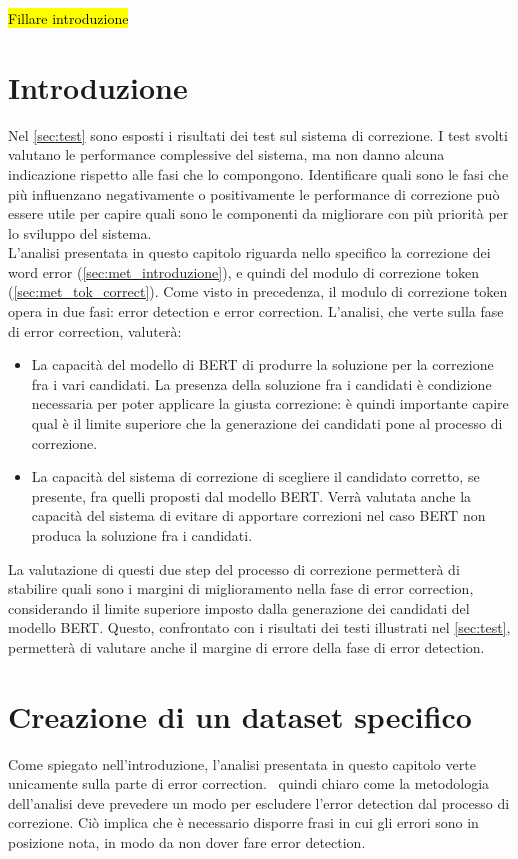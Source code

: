 \hl{Fillare introduzione}

\section{Introduzione}
\label{sec:ana_intro}
Nel \autoref{sec:test} sono esposti i risultati dei test sul sistema di correzione. I test svolti valutano le performance complessive del sistema, ma non danno alcuna indicazione rispetto alle fasi che lo compongono. Identificare quali sono le fasi che più influenzano negativamente o positivamente le performance di correzione può essere utile per capire quali sono le componenti da migliorare con più priorità per lo sviluppo del sistema.\\
L'analisi presentata in questo capitolo riguarda nello specifico la correzione dei word error (\autoref{sec:met_introduzione}), e quindi del modulo di correzione token (\autoref{sec:met_tok_correct}). Come visto in precedenza, il modulo di correzione token opera in due fasi: error detection e error correction. L'analisi, che verte sulla fase di error correction, valuterà:
\begin{itemize}
\item La capacità del modello di BERT di produrre la soluzione per la correzione fra i vari candidati. La presenza della soluzione fra i candidati è condizione necessaria per poter applicare la giusta correzione: è quindi importante capire qual è il limite superiore che la generazione dei candidati pone al processo di correzione.

\item La capacità del sistema di correzione di scegliere il candidato corretto, se presente, fra quelli proposti dal modello BERT. Verrà valutata anche la capacità del sistema di evitare di apportare correzioni nel caso BERT non produca la soluzione fra i candidati.
\end{itemize}
La valutazione di questi due step del processo di correzione permetterà di stabilire quali sono i margini di miglioramento nella fase di error correction, considerando il limite superiore imposto dalla generazione dei candidati del modello BERT. Questo, confrontato con i risultati dei testi illustrati nel \autoref{sec:test}, permetterà di valutare anche il margine di errore della fase di error detection.


\section{Creazione di un dataset specifico}
\label{sec:ana_dst}
Come spiegato nell'introduzione, l'analisi presentata in questo capitolo verte unicamente sulla parte di error correction. \E\ quindi chiaro come la metodologia dell'analisi deve prevedere un modo per escludere l'error detection dal processo di correzione. Ciò implica che è necessario disporre frasi in cui gli errori sono in posizione nota, in modo da non dover fare error detection.

